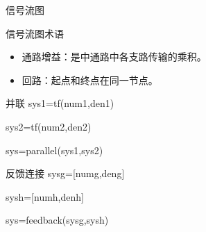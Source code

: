  \begin{frame}{信号流图}
 \begin{block}{信号流图术语}
 \begin{itemize}
 \item<+-> 通路增益：是中通路中各支路传输的乘积。
 \item<+-> 回路：起点和终点在同一节点。
 \end{itemize}
 \end{block}
 \begin{block}{并联}
 sys1=tf(num1,den1)
 
 sys2=tf(num2,den2)
 
 sys=parallel(sys1,sys2)
 \end{block}
 \end{frame}
 \begin{frame}
 \begin{block}{反馈连接}
sysg=[numg,deng]

sysh=[numh,denh]

sys=feedback(sysg,sysh)
 \end{block}
 \end{frame}
